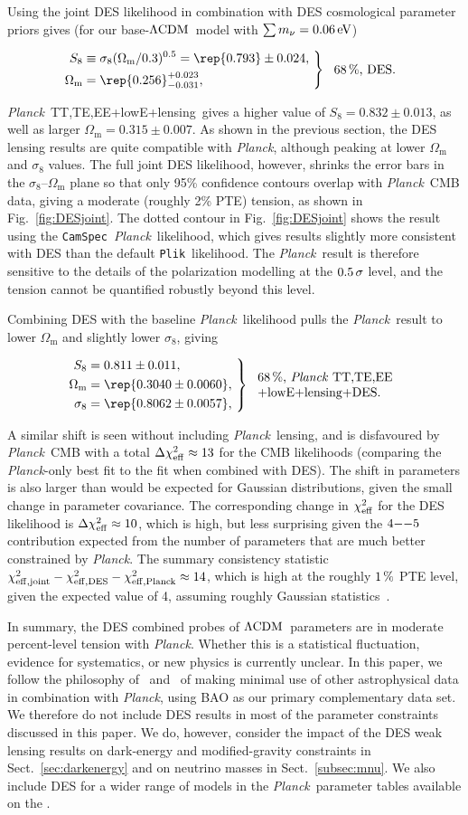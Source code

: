 \documentclass[longauth,traditabstract]{aa}
\def\Planck{\textit{Planck}}
\def\,{\thinspace}
\newcommand{\pbwidth}{4cm}
\newcommand{\leftparbox}[2]{\parbox{#1}{\begin{flushleft} #2 \end{flushleft}}}
\newcommand{\twoonesig}[4][\pbwidth]{
\begin{equation}
\left.
 \begin{aligned}
#2 \\ #3
 \end{aligned}
\ \right\} \ \ \mbox{\text{\leftparbox{#1}{68\,\%,~#4}}}
\end{equation}
}
\newcommand{\threeonesig}[5][\pbwidth]{
\begin{equation}
\left.
 \begin{aligned}
#2 \\ #3 \\ #4
 \end{aligned}
\ \right\} \ \ \mbox{\text{\leftparbox{#1}{68\,\%,~#5}}}
\end{equation}
}
\newcommand{\camspec}{{\tt CamSpec}}
\newcommand{\plik}{{\tt Plik}}
\newcommand{\effchisquare}{\chi^2_{\rm eff}}
\newcommand{\dchisquare}{\Delta\effchisquare}
\newcommand{\mksym}[1]{\ifmmode {\rm #1}\else #1\fi}
\newcommand{\dataplus}{\allowbreak+}
\newcommand{\lensing}{\mksym{lensing}}
\newcommand{\TTTEEE}{\mksym{TT,TE,EE}}
\newcommand{\planckTTTEEEonly}{\planck\ \TTTEEE}
\newcommand{\lowE}{\mksym{lowE}}
\newcommand{\planckall}{\planckTTTEEEonly\dataplus\lowE}
\newcommand{\planckalllensing}{\planckall\dataplus\lensing}
\newcommand{\lcdm}{\texorpdfstring{{$\rm{\Lambda CDM}$}}{ΛCDM}}
\newcommand{\sumnu}{\sum m_\nu}
\providecommand{\text}[1]{\rm{#1}}
\newcommand{\eV}{\,\text{eV}}
\providecommand{\Omm}{\Omega_{\mathrm{m}}}
\newcommand{\paramsI}{\citetalias{planck2013-p11}}
\newcommand{\paramsII}{\citetalias{planck2014-a15}}
\newcommand{\PLA}{\citetalias{PLA}}
\newcommand{\planck}{\Planck}
\begin{document}
Using the joint DES likelihood in combination with DES cosmological parameter priors gives (for our base-\lcdm\ model with $\sumnu=0.06\eV$)
\twoonesig[2cm]{S_8 &\equiv \sigma_8(\Omm/0.3)^{0.5} = \rep{0.793}\pm 0.024, }{\Omm &= \rep{0.256}^{+0.023}_{-0.031},}{DES.}
\planckalllensing\ gives a higher value of $S_8=0.832\pm0.013$, as well as larger $\Omm=0.315\pm0.007$.
As shown in the previous section, the DES lensing results are quite compatible with \planck, although peaking at lower $\Omm$ and $\sigma_8$ values. The full joint DES likelihood, however, shrinks the error bars in the $\sigma_8$--$\Omm$ plane so that only 95\,\% confidence contours overlap with \planck\ CMB data, giving a moderate (roughly 2\,\% PTE) tension, as shown in Fig.~\ref{fig:DESjoint}. The dotted contour in Fig.~\ref{fig:DESjoint} shows the result using the \camspec\ \planck\ likelihood,  which gives results slightly more consistent with DES than the default \plik\ likelihood. The \planck\ result is therefore sensitive to the details of the polarization modelling at the $0.5\,\sigma$ level, and the tension cannot be quantified robustly beyond this level.

Combining DES with the baseline \planck\ likelihood pulls the \planck\ result to lower $\Omm$ and slightly lower $\sigma_8$, giving
\threeonesig[4cm]{S_8 &= 0.811\pm 0.011,}{\Omm &= \rep{0.3040\pm 0.0060},}{\sigma_8 &= \rep{0.8062\pm 0.0057},}{\planckall\dataplus\lensing\dataplus{DES}.}
A similar shift is seen without including \planck\ lensing, and is disfavoured by \planck\ CMB with a total $\dchisquare\approx 13$ for the CMB likelihoods (comparing the \planck-only best fit to the fit when combined with DES). The shift in parameters is also larger than would be expected for Gaussian distributions, given the small change in parameter covariance.
The corresponding change in $\chi^2_{\rm eff}$  for the DES likelihood is $\dchisquare\approx 10$, which is high,
 but less surprising given the $4\text{--}5$ contribution expected from the number of parameters that are much better constrained by \planck.
The summary consistency statistic $\chi^2_{\rm eff,joint} - \chi^2_{\rm eff, DES} - \chi^2_{\rm eff, Planck}  \approx 14$, which is high at the roughly $1\,\%$ PTE level, given the expected value of 4, assuming roughly Gaussian statistics~\citep{Raveri:2018wln}.

In summary, the DES combined probes of \lcdm\ parameters are in moderate percent-level tension with \planck.
Whether this is a statistical fluctuation, evidence for systematics, or new physics is currently unclear. In this paper, we follow the philosophy of \paramsI\ and \paramsII\ of making minimal use of other astrophysical data in combination with \planck, using BAO as our primary complementary data set. We therefore
do not include DES results in most of the parameter constraints discussed in
 this paper.
We do, however, consider the impact of the DES weak lensing results on dark-energy and modified-gravity constraints in Sect.~\ref{sec:darkenergy} and on neutrino masses in Sect.~\ref{subsec:mnu}. We also include DES for a wider
range of models in the \Planck\  parameter tables available on the \PLA.
\end{document}

